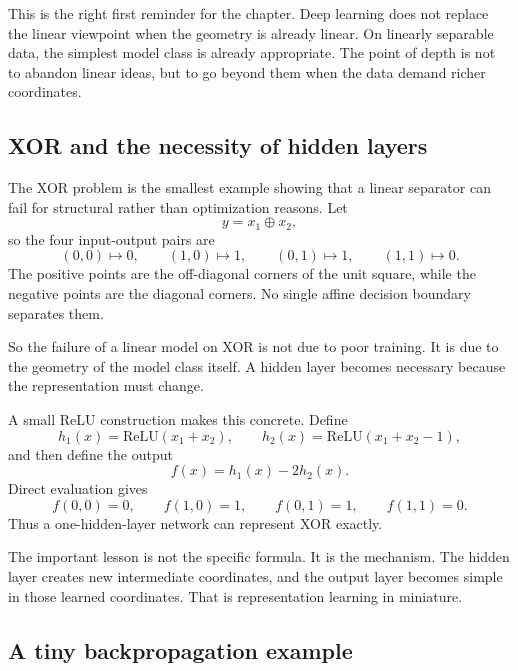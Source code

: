 \medskip

This is the right first reminder for the chapter.
Deep learning does not replace the linear viewpoint when the geometry is already linear.
On linearly separable data, the simplest model class is already appropriate.
The point of depth is not to abandon linear ideas, but to go beyond them when the data demand richer coordinates.

\subsection*{XOR and the necessity of hidden layers}

The XOR problem is the smallest example showing that a linear separator can fail for structural rather than optimization reasons.
Let
\[
 y=x_1\oplus x_2,
\]
so the four input-output pairs are
\[
(0,0)\mapsto 0,
\qquad
(1,0)\mapsto 1,
\qquad
(0,1)\mapsto 1,
\qquad
(1,1)\mapsto 0.
\]
The positive points are the off-diagonal corners of the unit square, while the negative points are the diagonal corners.
No single affine decision boundary separates them.

\medskip

So the failure of a linear model on XOR is not due to poor training.
It is due to the geometry of the model class itself.
A hidden layer becomes necessary because the representation must change.

\medskip

A small ReLU construction makes this concrete.
Define
\[
 h_1(x)=\mathrm{ReLU}(x_1+x_2),
 \qquad
 h_2(x)=\mathrm{ReLU}(x_1+x_2-1),
\]
and then define the output
\[
 f(x)=h_1(x)-2h_2(x).
\]
Direct evaluation gives
\[
 f(0,0)=0,
 \qquad
 f(1,0)=1,
 \qquad
 f(0,1)=1,
 \qquad
 f(1,1)=0.
\]
Thus a one-hidden-layer network can represent XOR exactly.

\medskip

The important lesson is not the specific formula.
It is the mechanism.
The hidden layer creates new intermediate coordinates, and the output layer becomes simple in those learned coordinates.
That is representation learning in miniature.

\subsection*{A tiny backpropagation example}

